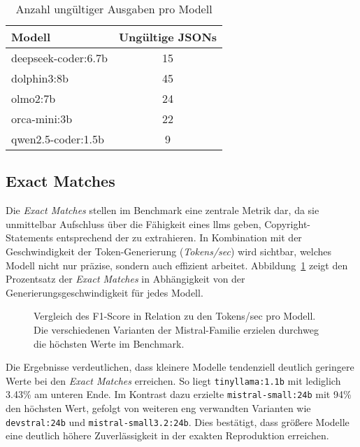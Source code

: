 \begin{table}[H]
    \centering
    \begin{tabular}{l c}
        \toprule
        \textbf{Modell} & \textbf{Ungültige JSONs} \\
        \midrule
        deepseek-coder:6.7b     & 15 \\
        dolphin3:8b             & 45 \\
        olmo2:7b                & 24 \\
        orca-mini:3b            & 22 \\
        qwen2.5-coder:1.5b      & 9  \\
        \bottomrule
    \end{tabular}
    \caption{Anzahl ungültiger Ausgaben pro Modell}
    \label{tab:model-invalid-jsons}
\end{table}


\subsection{Exact Matches}

Die \textit{Exact Matches} stellen im Benchmark eine zentrale Metrik dar, da sie unmittelbar Aufschluss über die Fähigkeit eines \glspl{llm} geben, Copyright-Statements entsprechend der  zu extrahieren.
In Kombination mit der Geschwindigkeit der Token-Generierung (\textit{Tokens/sec}) wird sichtbar, welches Modell nicht nur präzise, sondern auch effizient arbeitet.
Abbildung~\ref{fig:exact-matches-overall-result} zeigt den Prozentsatz der \textit{Exact Matches} in Abhängigkeit von der Generierungsgeschwindigkeit für jedes Modell.

\begin{figure}[ht]
    \centering
    \caption{Vergleich des F1-Score in Relation zu den Tokens/sec pro Modell. Die verschiedenen Varianten der Mistral-Familie erzielen durchweg die höchsten Werte im Benchmark.}
    \label{fig:exact-matches-overall-result}
\end{figure}

Die Ergebnisse verdeutlichen, dass kleinere Modelle tendenziell deutlich geringere Werte bei den \textit{Exact Matches} erreichen.
So liegt \texttt{tinyllama:1.1b} mit lediglich \num{3.43}\% am unteren Ende.
Im Kontrast dazu erzielte \texttt{mistral-small:24b} mit \num{94}\% den höchsten Wert, gefolgt von weiteren eng verwandten Varianten wie \texttt{devstral:24b} und \texttt{mistral-small3.2:24b}.
Dies bestätigt, dass größere Modelle eine deutlich höhere Zuverlässigkeit in der exakten Reproduktion erreichen.

